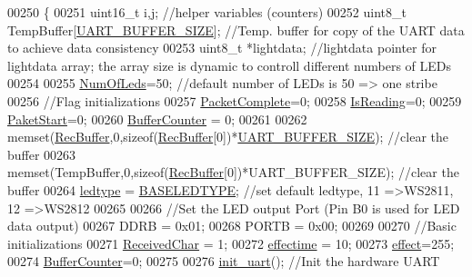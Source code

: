 \begin{DoxyCode}
{00250 \{
00251     uint16\_t i,j;                           \textcolor{comment}{//helper variables (counters)}
00252     uint8\_t TempBuffer[\hyperlink{globals_8h_a0d57378e32bf8278011460740bc29f7f}{UART\_BUFFER\_SIZE}];   \textcolor{comment}{//Temp. buffer for copy of the UART data to
       achieve data consistency    }
00253     uint8\_t *lightdata;                     \textcolor{comment}{//lightdata pointer for lightdata array; the array size is
       dynamic to controll different numbers of LEDs}
00254     
00255     \hyperlink{globals_8h_ad5db4045aed262ed4aae2af9d81fab98}{NumOfLeds}=50;                          \textcolor{comment}{//default number of LEDs is 50 => one stribe}
00256     \textcolor{comment}{//Flag initializations}
00257     \hyperlink{globals_8h_a1b09d1a5bcf4c8ab435bb3c9e36def59}{PacketComplete}=0;                         
00258     \hyperlink{globals_8h_a922ad5baed647eca43ad1a979e162ebd}{IsReading}=0;
00259     \hyperlink{globals_8h_aaa3bddd2273257ac5ec259197b62e984}{PaketStart}=0; 
00260     \hyperlink{globals_8h_aa6fcb4d4fca4554ac73bef10668c23cd}{BufferCounter} = 0;
00261 
00262     memset(\hyperlink{globals_8h_a5d735865707e6694a8173d629e0b4d5c}{RecBuffer},0,\textcolor{keyword}{sizeof}(\hyperlink{globals_8h_a5d735865707e6694a8173d629e0b4d5c}{RecBuffer}[0])*\hyperlink{globals_8h_a0d57378e32bf8278011460740bc29f7f}{UART\_BUFFER\_SIZE});    \textcolor{comment}{//clear
       the buffer  }
00263     memset(TempBuffer,0,\textcolor{keyword}{sizeof}(\hyperlink{globals_8h_a5d735865707e6694a8173d629e0b4d5c}{RecBuffer}[0])*UART\_BUFFER\_SIZE);    \textcolor{comment}{//clear the buffer}
00264     \hyperlink{globals_8h_a722e1eb38b661d1338ada3cc7a4049a0}{ledtype} = \hyperlink{globals_8h_af07a5ce170c7be13d096843960e7b9da}{BASELEDTYPE};                    \textcolor{comment}{//set default ledtype, 11 =>WS2811, 12
       =>WS2812}
00265     
00266     \textcolor{comment}{//Set the LED output Port (Pin B0 is used for LED data output)}
00267     DDRB = 0x01;                        
00268     PORTB = 0x00;
00269 
00270     \textcolor{comment}{//Basic initializations}
00271     \hyperlink{globals_8h_ab5490074aaca289e986e9a00e0c25663}{ReceivedChar} = 1;
00272     \hyperlink{globals_8h_ac2445d316b2972d381edeac44bb6a226}{effectime} = 10;
00273     \hyperlink{globals_8h_a053b8e1f039c19251b90d60317db8aed}{effect}=255;
00274     \hyperlink{globals_8h_aa6fcb4d4fca4554ac73bef10668c23cd}{BufferCounter}=0;
00275     
00276     \hyperlink{ws2811lichterkette_8c_ac7b3df0fa68526d64c732d5f916e34b1}{init\_uart}();                           \textcolor{comment}{//Init the hardware UART}
}
\end{DoxyCode}
